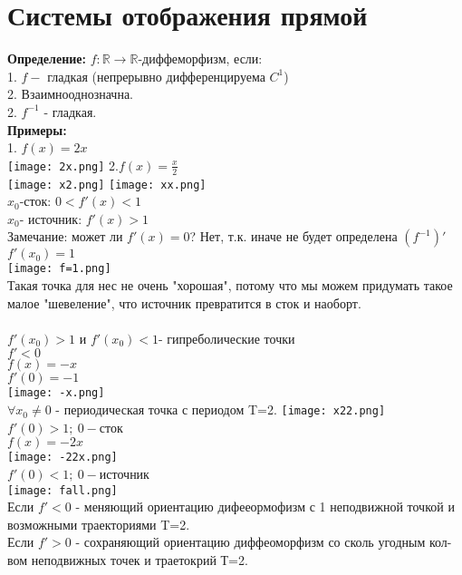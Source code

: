 \documentclass[12pt,a4paper]{article}
\begin{document}
\section*{Системы отображения прямой}
\textbf{Определение: }\(f:\mathbb{R}\to \mathbb{R}\)-диффеморфизм, если:\\
1. \(f-\) гладкая (непрерывно дифференцируема \(C^1\))\\
2. Взаимнооднозначна.\\
2. \(f^{-1}\) - гладкая.\\
\textbf{Примеры: }\\
1. \(f(x)=2x\)\\
\texttt{[image: 2x.png]}
2.\(f(x)=\frac{x}{2}\)\\
\texttt{[image: x2.png]}
\newpage
\texttt{[image: xx.png]}\\
\(x_0\)-сток: \(0<f'(x)<1\)\\
\(x_0\)- источник: \(f'(x)>1\)\\
Замечание: может ли \(f'(x)=0\)? Нет, т.к. иначе не будет определена \((f^{-1})'\)\\
\(f'(x_0)=1\)\\
\texttt{[image: f=1.png]}\\
Такая точка для нес не очень "хорошая", потому что мы можем придумать такое малое "шевеление", что источник превратится в сток и наоборт. \\
\\
\(f'(x_0)>1\) и \(f'(x_0)<1\)- гипреболические точки\\ \newpage
\(f'<0\)\\
\(f(x)=-x\)\\\(f'(0)=-1\)\\ \texttt{[image: -x.png]}\\ \(\forall x_0 \neq 0\) - периодическая точка с периодом T=2.
\texttt{[image: x22.png]}\\
\(f'(0)>1 ;\ 0-\)сток\\
\(f(x)= -2x\)\\
\texttt{[image: -22x.png]}\\
\(f'(0)<1;\ 0-\)источник\\
\texttt{[image: fall.png]}
\\
Если \(f'<0\) - меняющий ориентацию дифееормофизм с 1 неподвижной точкой и возможными траекториями T=2.\\
Если \(f'>0\) - сохраняющий ориентацию диффеоморфизм со сколь угодным кол-вом неподвижных точек и траетокрий Т=2.\\
\end{document}
